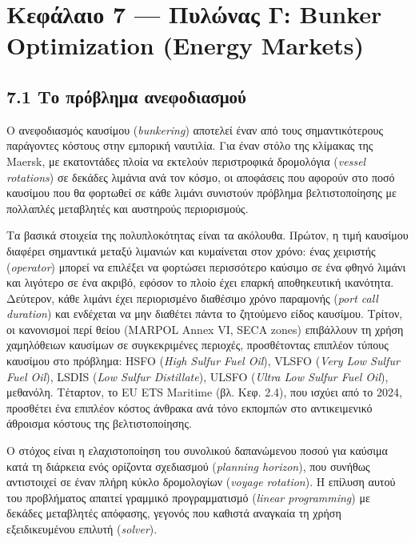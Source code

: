 \documentclass[11pt,a4paper,greek,twoside]{template-xe}
\begin{document}
\pagebreak

\chapter{Κεφάλαιο 7 --- Πυλώνας Γ: Bunker Optimization (Energy
Markets)}\label{ux3baux3b5ux3c6ux3acux3bbux3b1ux3b9ux3bf-7-ux3c0ux3c5ux3bbux3ceux3bdux3b1ux3c2-ux3b3-bunker-optimization-energy-markets}

\section{7.1 Το πρόβλημα
ανεφοδιασμού}\label{ux3c4ux3bf-ux3c0ux3c1ux3ccux3b2ux3bbux3b7ux3bcux3b1-ux3b1ux3bdux3b5ux3c6ux3bfux3b4ux3b9ux3b1ux3c3ux3bcux3bfux3cd}

Ο ανεφοδιασμός καυσίμου (\emph{bunkering}) αποτελεί έναν από τους
σημαντικότερους παράγοντες κόστους στην εμπορική ναυτιλία. Για έναν
στόλο της κλίμακας της Maersk, με εκατοντάδες πλοία να εκτελούν
περιστροφικά δρομολόγια (\emph{vessel rotations}) σε δεκάδες λιμάνια ανά
τον κόσμο, οι αποφάσεις που αφορούν στο ποσό καυσίμου που θα φορτωθεί σε
κάθε λιμάνι συνιστούν πρόβλημα βελτιστοποίησης με πολλαπλές μεταβλητές
και αυστηρούς περιορισμούς.

Τα βασικά στοιχεία της πολυπλοκότητας είναι τα ακόλουθα. Πρώτον, η τιμή
καυσίμου διαφέρει σημαντικά μεταξύ λιμανιών και κυμαίνεται στον χρόνο:
ένας χειριστής (\emph{operator}) μπορεί να επιλέξει να φορτώσει
περισσότερο καύσιμο σε ένα φθηνό λιμάνι και λιγότερο σε ένα ακριβό,
εφόσον το πλοίο έχει επαρκή αποθηκευτική ικανότητα. Δεύτερον, κάθε
λιμάνι έχει περιορισμένο διαθέσιμο χρόνο παραμονής (\emph{port call
duration}) και ενδέχεται να μην διαθέτει πάντα το ζητούμενο είδος
καυσίμου. Τρίτον, οι κανονισμοί περί θείου (MARPOL Annex VI, SECA zones)
επιβάλλουν τη χρήση χαμηλόθειων καυσίμων σε συγκεκριμένες περιοχές,
προσθέτοντας επιπλέον τύπους καυσίμου στο πρόβλημα: HSFO (\emph{High
Sulfur Fuel Oil}), VLSFO (\emph{Very Low Sulfur Fuel Oil}), LSDIS
(\emph{Low Sulfur Distillate}), ULSFO (\emph{Ultra Low Sulfur Fuel
Oil}), μεθανόλη. Τέταρτον, το EU ETS Maritime (βλ. Κεφ. 2.4), που ισχύει
από το 2024, προσθέτει ένα επιπλέον κόστος άνθρακα ανά τόνο εκπομπών στο
αντικειμενικό άθροισμα κόστους της βελτιστοποίησης.

Ο στόχος είναι η ελαχιστοποίηση του συνολικού δαπανώμενου ποσού για
καύσιμα κατά τη διάρκεια ενός ορίζοντα σχεδιασμού (\emph{planning
horizon}), που συνήθως αντιστοιχεί σε έναν πλήρη κύκλο δρομολογίων
(\emph{voyage rotation}). Η επίλυση αυτού του προβλήματος απαιτεί
γραμμικό προγραμματισμό (\emph{linear programming}) με δεκάδες
μεταβλητές απόφασης, γεγονός που καθιστά αναγκαία τη χρήση
εξειδικευμένου επιλυτή (\emph{solver}).
\end{document}
